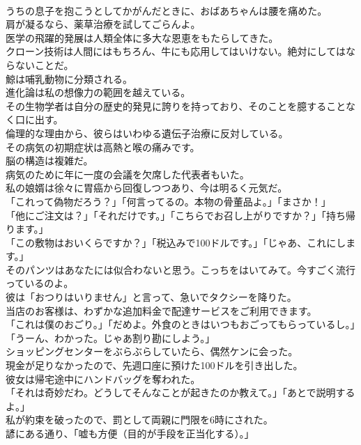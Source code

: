\documentclass[8pt]{extreport}
\begin{document}
\begin{CJK}{UTF8}{min}
\\	うちの息子を抱こうとしてかがんだときに、おばあちゃんは腰を痛めた。
\\	肩が凝るなら、薬草治療を試してごらんよ。
\\	医学の飛躍的発展は人類全体に多大な恩恵をもたらしてきた。
\\	クローン技術は人間にはもちろん、牛にも応用してはいけない。絶対にしてはならないことだ。
\\	鯨は哺乳動物に分類される。
\\	進化論は私の想像力の範囲を越えている。
\\	その生物学者は自分の歴史的発見に誇りを持っており、そのことを臆することなく口に出す。
\\	倫理的な理由から、彼らはいわゆる遺伝子治療に反対している。
\\	その病気の初期症状は高熱と喉の痛みです。
\\	脳の構造は複雑だ。
\\	病気のために年に一度の会議を欠席した代表者もいた。
\\	私の娘婿は徐々に胃癌から回復しつつあり、今は明るく元気だ。
\\	「これって偽物だろう？」「何言ってるの。本物の骨董品よ。」「まさか！」
\\	「他にご注文は？」「それだけです。」「こちらでお召し上がりですか？」「持ち帰ります。」
\\	「この敷物はおいくらですか？」「税込みで100ドルです。」「じゃあ、これにします。」
\\	そのパンツはあなたには似合わないと思う。こっちをはいてみて。今すごく流行っているのよ。
\\	彼は「おつりはいりません」と言って、急いでタクシーを降りた。
\\	当店のお客様は、わずかな追加料金で配達サービスをご利用できます。
\\	「これは僕のおごり。」「だめよ。外食のときはいつもおごってもらっているし。」「うーん、わかった。じゃあ割り勘にしよう。」
\\	ショッピングセンターをぶらぶらしていたら、偶然ケンに会った。
\\	現金が足りなかったので、先週口座に預けた100ドルを引き出した。
\\	彼女は帰宅途中にハンドバッグを奪われた。
\\	「それは奇妙だわ。どうしてそんなことが起きたのか教えて。」「あとで説明するよ。」
\\	私が約束を破ったので、罰として両親に門限を6時にされた。
\\	諺にある通り、「嘘も方便（目的が手段を正当化する）。」

\end{CJK}
\end{document}
